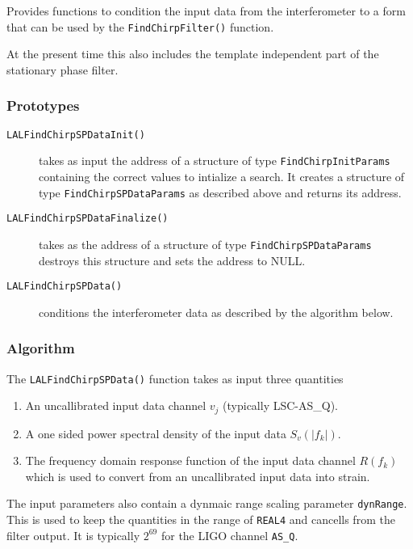 Provides functions to condition the input data from the interferometer
to a form that can be used by the \texttt{FindChirpFilter()} function.

At the present time this also includes the template independent part of the
stationary phase filter.

\subsubsection*{Prototypes}
\vspace{0.1in}


\begin{description}
\item[\texttt{LALFindChirpSPDataInit()}] takes as input the address
of a structure of type \texttt{FindChirpInitParams} containing the correct
values to intialize a search. It creates a structure of type
\texttt{FindChirpSPDataParams} as described above and returns its address.

\item[\texttt{LALFindChirpSPDataFinalize()}] takes as the address
of a structure of type \texttt{FindChirpSPDataParams} destroys this 
structure and sets the address to NULL.

\item[\texttt{LALFindChirpSPData()}] conditions the interferometer data
as described by the algorithm below.
\end{description}

\subsubsection*{Algorithm}

The \texttt{LALFindChirpSPData()} function takes as input three quantities
\begin{enumerate}
\item An uncallibrated input data channel $v_j$ (typically LSC-AS\_Q).
\item A one sided power spectral density of the input data $S_v(|f_k|)$.
\item The frequency domain response function of the input data channel
$R(f_k)$ which is used to convert from an uncallibrated input data into
strain.
\end{enumerate}

The input parameters also contain a dynmaic range scaling parameter
\texttt{dynRange}. This is used to keep the quantities in the range of
\texttt{REAL4} and cancells from the filter output. It is typically $2^{69}$
for the LIGO channel \texttt{AS\_Q}.

